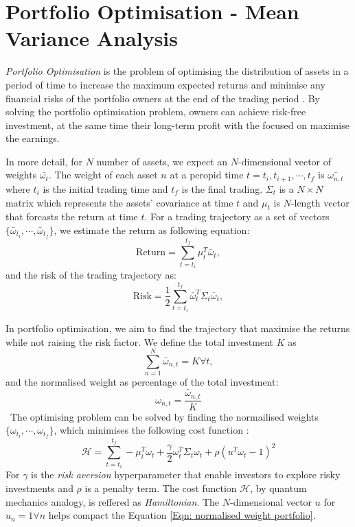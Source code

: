 \section{Portfolio Optimisation - Mean Variance Analysis} \label{Sec: Portfolio Optimisation}

\emph{Portfolio Optimisation} is the problem of optimising the distribution of assets in a period of time to increase the maximum expected returns and minimise any financial risks of the portfolio owners at the end of the trading period \cite{abdelazizMultiobjectiveStochasticProgramming2007}.
By solving the portfolio optimisation problem, owners can achieve risk-free investment, at the same time their long-term profit with the focused on maximise the earnings.

In more detail, for $N$ number of assets, we expect an $N$-dimensional vector of weights $\bar{\omega_t}$.
The weight of each asset $n$ at a peropid time $t = t_i, t_{i+1}, \cdots, t_f$ is $\bar{\omega_{n,t}}$ where $t_i$ is the initial trading time and $t_f$ is the final trading.
$\Sigma_t$ is a $N \times N$ matrix which represents the assets' covariance at time $t$ and $\mu_t$ is $N$-length vector that forcasts the return at time $t$.
For a trading trajectory as a set of vectors $\{ \bar\omega_{t_i}, \cdots, \bar\omega_{t_f} \}$, we estimate the return as following equation:
\begin{equation}
    \text{Return} = \sum^{t_f}_{t=t_i}\mu^T_t \bar\omega_t,
\end{equation}
and the risk of the trading trajectory as:
\begin{equation}
    \text{Risk} = \frac{1}{2} \sum^{t_f}_{t=t_i} \bar\omega^T_t \Sigma_t \bar\omega_t,
\end{equation}

In portfolio optimisation, we aim to find the trajectory that maximise the returns while not raising the risk factor.
We define the total investment $K$ as
\begin{equation} \label{Eqn: normalised weight portfolio}
    \sum^N_{n=1} \bar\omega_{n,t} =  K \forall t,
\end{equation}
and the normalised weight as percentage of the total investment:
\begin{equation}
    \omega_{n,t} = \frac{\bar\omega_{n,t}}{K}
\end{equation}\
The optimising problem can be solved by finding the normailised weights $\{ \omega_{t_i}, \cdots, \omega_{t_f} \}$, which minimises the following cost function \cite{rosenbergSolvingOptimalTrading2015}:
\begin{equation}
    \mathcal{H} = \sum^{t_f}_{t=t_i} -\mu^T_t \omega_t + \frac{\gamma}{2}\omega^T_t \Sigma_t\omega_t + \rho(u^T\omega_t-1)^2
\end{equation}
For $\gamma$ is the \emph{risk aversion} hyperparameter that enable investors to explore risky investments and $\rho$ is a penalty term.
The cost function $\mathcal{H}$, by quantum mechanics analogy, is reffered as \emph{Hamiltonian}.
The $N$-dimensional vector $u$ for $u_n = 1 \forall n$ helps compact the Equation \ref{Eqn: normalised weight portfolio}.

